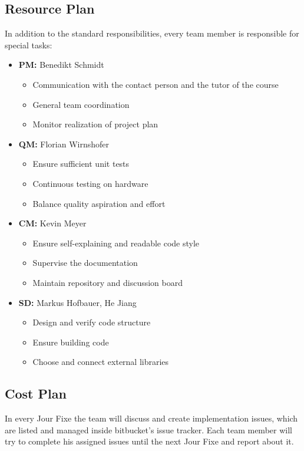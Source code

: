 \documentclass[12pt]{article}
\begin{document}
\subsection{Resource Plan}
In addition to the standard responsibilities, every team member is responsible for special tasks:
\begin{itemize}
	\item \textbf{PM:} Benedikt Schmidt
	\begin{itemize}
		\item Communication with the contact person and the tutor of the course
		\item General team coordination
		\item Monitor realization of project plan
	\end{itemize}
	 
	\item \textbf{QM:} Florian Wirnshofer
	\begin{itemize}
		\item Ensure sufficient unit tests
		\item Continuous testing on hardware
		\item Balance quality aspiration and effort
	\end{itemize}
	
	\item \textbf{CM:} Kevin Meyer
	\begin{itemize}
		\item Ensure self-explaining and readable code style
		\item Supervise the documentation
		\item Maintain repository and discussion board
	\end{itemize}
	
	\item \textbf{SD:} Markus Hofbauer, He Jiang 
	\begin{itemize}
		\item Design and verify code structure
		\item Ensure building code
		\item Choose and connect external libraries
	\end{itemize}
	
\end{itemize}

\subsection{Cost Plan}
In every Jour Fixe the team will discuss and create implementation issues, which are listed and managed inside bitbucket's issue tracker. 
Each team member will try to complete his assigned issues until the next Jour Fixe and report about it.
\end{document}
